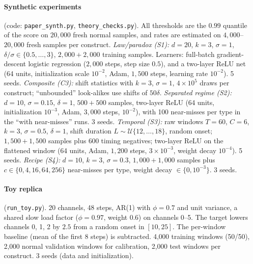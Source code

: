 \paragraph{Synthetic experiments} (code: \texttt{paper\_synth.py}, \texttt{theory\_checks.py}). All thresholds are the $0.99$ quantile of the score on $20{,}000$ fresh normal samples, and rates are estimated on $4{,}000$--$20{,}000$ fresh samples per construct. \emph{Law/paradox (S1):} $d=20$, $k=3$, $\sigma=1$, $\delta/\sigma\in\{0.5,\dots,3\}$, $2{,}000+2{,}000$ training samples. Learners: full-batch gradient-descent logistic regression ($2{,}000$ steps, step size $0.5$), and a two-layer ReLU net (64 units, initialization scale $10^{-2}$, Adam, $1{,}500$ steps, learning rate $10^{-2}$). 5 seeds. \emph{Composite (C3):} shift statistics with $k=3$, $\sigma=1$, $4\times10^5$ draws per construct; ``unbounded'' look-alikes use shifts of $50\delta$. \emph{Separated regime (S2):} $d=10$, $\sigma=0.15$, $\delta=1$, $500+500$ samples, two-layer ReLU (64 units, initialization $10^{-3}$, Adam, $3{,}000$ steps, $10^{-2}$), with 100 near-misses per type in the ``with near-misses'' runs. 3 seeds. \emph{Temporal (S3):} raw windows $T=60$, $C=6$, $k=3$, $\sigma=0.5$, $\delta=1$, shift duration $L\sim\mathcal U\{12,\dots,18\}$, random onset; $1{,}500+1{,}500$ samples plus $600$ timing negatives; two-layer ReLU on the flattened window (64 units, Adam, $1{,}200$ steps, $3\times10^{-3}$, weight decay $10^{-4}$). 5 seeds. \emph{Recipe (S4):} $d=10$, $k=3$, $\sigma=0.3$, $1{,}000+1{,}000$ samples plus $c\in\{0,4,16,64,256\}$ near-misses per type, weight decay $\in\{0,10^{-3}\}$. 3 seeds.

\paragraph{Toy replica} (\texttt{run\_toy.py}). 20 channels, 48 steps, AR(1) with $\phi=0.7$ and unit variance, a shared slow load factor ($\phi=0.97$, weight $0.6$) on channels 0--5. The target lowers channels 0, 1, 2 by $2.5$ from a random onset in $[10,25]$. The per-window baseline (mean of the first 8 steps) is subtracted. 4,000 training windows (50/50), 2,000 normal validation windows for calibration, 2,000 test windows per construct. 3 seeds (data and initialization).

